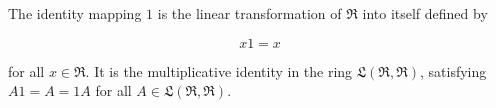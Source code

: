 The identity mapping $1$ is the linear transformation of $\mathfrak{R}$ into itself defined by

$$x1 = x$$

for all $x \in \mathfrak{R}$. It is the multiplicative identity in the ring $\mathfrak{L}(\mathfrak{R}, \mathfrak{R})$, satisfying $A1 = A = 1A$ for all $A \in \mathfrak{L}(\mathfrak{R}, \mathfrak{R})$.
